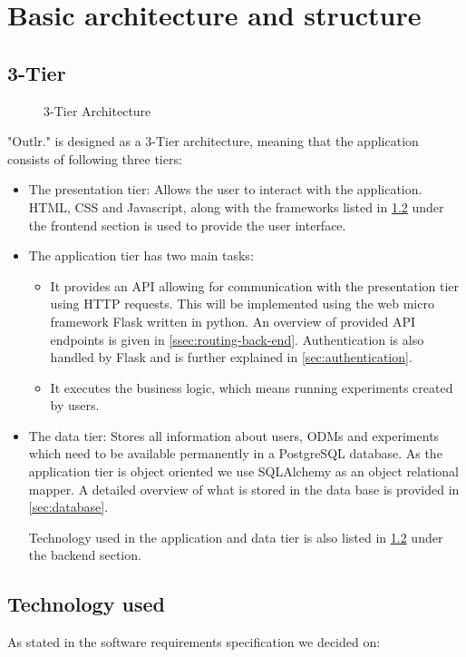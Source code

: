 \section{Basic architecture and structure}
\subsection{3-Tier}
\begin{figure}[!ht]
    \centering
    
    \caption{3-Tier Architecture}
    \label{fig:three-tier-architecture}
\end{figure}

"Outlr." is designed as a 3-Tier architecture, meaning that the application consists of following three tiers: 
\begin{itemize}
    \item The presentation tier: Allows the user to interact with the application. HTML, CSS and Javascript, along with the frameworks listed in \ref{sec:technology_used} under the frontend section is used to provide the user interface.
     \item The application tier has two main tasks:
     \begin{itemize}
         \item It provides an API allowing for communication with the presentation tier using HTTP requests. This will be implemented using the web micro framework Flask written in python. An overview of provided API endpoints is given in \ref{ssec:routing-back-end}. Authentication is also handled by Flask and is further explained in \ref{sec:authentication}.
         \item It executes the business logic, which means running experiments created by users. 
     \end{itemize}
     \item The data tier: Stores all information about users, ODMs and experiments which need to be available permanently in a PostgreSQL database. As the application tier is object oriented we use SQLAlchemy as an object relational mapper.
     A detailed overview of what is stored in the data base is provided in \ref{sec:database}.
     
     Technology used in the application and data tier is also listed in \ref{sec:technology_used} under the backend section.
\end{itemize}


\subsection{Technology used}
\label{sec:technology_used}
As stated in the software requirements specification we decided on:
